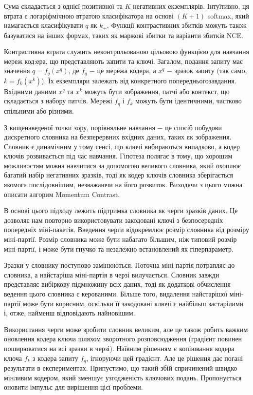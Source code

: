 Сума складається з однієї позитивної та $K$ негативних екземплярів. Інтуїтивно, ця втрата є логаріфмічною втратою класифікатора на основі $(K + 1)$ softmax, який намагається класифікувати $q$ як $k_{+}$. Функції контрастивних збитків можуть також базуватися на інших формах, таких як маржові збитки та варіанти збитків NCE.

Контрастивна втрата служить неконтрольованою цільовою функцією для навчання мереж код:ера, що представляють запити та ключі. Загалом, подання запиту має значення $q = f_{q} (x^{q})$, де $f_{q}$ $-$ це мережа кодера, а $x^{q}$ $-$ зразок запиту (так само, $k = f_{k} (x^{k})$). Їх екземпляри залежать від конкретного попередньогозавдання. Вхідними даними $x^{q}$ та $x^{k}$ можуть бути зображення, патчі або контекст, що складається з набору патчів. Мережі $f_{q}$ і $f_{k}$ можуть бути ідентичними, частково спільними або різними.

З вищенаведеної точки зору, порівняльне навчання $-$ це спосіб побудови дискретного словника на безперервних вхідних даних, таких як зображення. Словник є динамічним у тому сенсі, що ключі вибираються випадково, а кодер ключів розвивається під час навчання. Гіпотеза полягає в тому, що хорошим можливостям можна навчитися за допомогою великого словника, який охоплює багатий набір негативних зразків, тоді як кодер ключів словника зберігається якомога послідовнішим, незважаючи на його розвиток. Виходячи з цього можна описати алгорим Momentum Contrast.

В основі цього підходу лежить підтримка словника як черги зразків даних. Це дозволяє нам повторно використовувати закодовані ключі з безпосередніх попередніх міні-пакетів. Введення черги відокремлює розмір словника від розміру міні-партії. Розмір словника може бути набагато більшим, ніж типовий розмір міні-партії, і може бути гнучко та незалежно встановлений як гіперпараметр.

Зразки у словнику поступово замінюються. Поточна міні-партія потрапляє до словника, а найстаріша міні-партія в черзі вилучається. Словник завжди представляє вибіркову підмножину всіх даних, тоді як додаткові обчислення ведення цього словника є керованими. Більше того, видалення найстарішої міні-партії може бути корисним, оскільки її закодовані ключі є найбільш застарілими і, отже, найменш відповідають найновішим.

Використання черги може зробити словник великим, але це також робить важким оновлення кодера ключа шляхом зворотного розповсюдження (градієнт повинен поширюватися на всі зразки в черзі). Наївним рішенням є копіювання кодера ключа $f_{k}$ з кодера запиту $f_{q}$, ігноруючи цей градієнт. Але це рішення дає погані результати в експериментах. Припустимо, що такий збій спричинений швидко мінливим кодером, який зменшує узгодженість ключових подань. Пропонується оновити імпульс для вирішення цієї проблеми.

